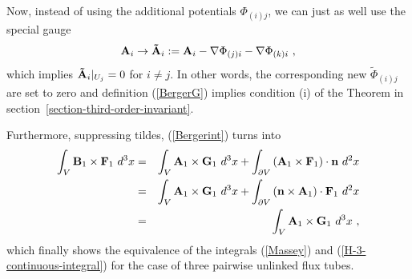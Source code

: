\documentclass[10pt]{iopart}
\begin{document}
Now, instead of using the additional potentials $\Phi_{(i)j}$, we can
just as well use the special gauge
\[ {\bf A}_i \rightarrow {\bf {\tilde A}}_i := {\bf A}_i -  \nabla \Phi_{(j)i}   -  \nabla \Phi_{(k)i}\ ,     \]
which implies ${\bf {\tilde A}}_i|_{U_j}=0$ for $i \neq j$. In other
words, the corresponding new $\tilde \Phi_{(i)j}$ are set to zero and
definition (\ref{BergerG}) implies condition (i) of the
Theorem in section~\ref{section-third-order-invariant}.

Furthermore, suppressing tildes, (\ref{Bergerint}) turns into
\begin{eqnarray}  \int_V{ {\bf B}_1 \times {\bf F}_1  \ d^3x}  & =  &  \int_V{ {\bf A}_1 \times {\bf G}_1  \ d^3x } + \int_{\partial V}{\left( {\bf A}_1 \times {\bf F}_1 \right) \cdot {\bf n} \ d^2x }\nonumber   \\
& = &   \int_V{ {\bf A}_1 \times {\bf G}_1  \ d^3x } + \int_{\partial V}{ \left({\bf n} \times {\bf A}_1 \right) \cdot {\bf F}_1 \ d^2x } \nonumber \\
& = &   \int_V{ {\bf A}_1 \times {\bf G}_1  \ d^3x } \ ,
\end{eqnarray}
which finally shows the equivalence of the integrals (\ref{Massey}) 
and (\ref{H-3-continuous-integral}) for the case of three pairwise
unlinked flux tubes.
\end{document}
